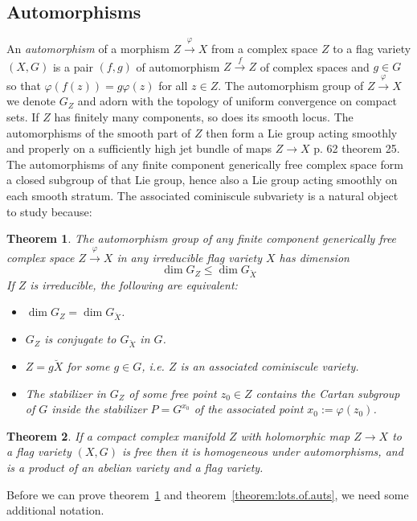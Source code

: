 \documentclass[a4paper,10pt]{amsart}
\newtheorem{theorem}{Theorem}
\theoremstyle{remark}
\begin{document}
\subsection{Automorphisms}\label{subsection:Freedom}
An \emph{automorphism} of a morphism \(Z\xrightarrow{\varphi}X\) from a complex space \(Z\) to a flag variety \((X,G)\) is a pair \((f,g)\) of automorphism \(Z\xrightarrow{f}Z\) of complex spaces and \(g\in G\) so that \(\varphi(f(z))=g\varphi(z)\) for all \(z\in Z\).
The automorphism group of \(Z\xrightarrow{\varphi}X\) we denote \(G_Z\) and adorn with the topology of uniform convergence on compact sets.
If \(Z\) has finitely many components, so does its smooth locus.
The automorphisms of the smooth part of \(Z\) then form a Lie group acting smoothly and properly on a sufficiently high jet bundle of maps \(Z\to X\) \cite{mckay2023introduction} p. 62 theorem 25.
The automorphisms of any finite component generically free complex space form a closed subgroup of that Lie group, hence also a Lie group acting smoothly on each smooth stratum.
The associated cominiscule subvariety is a natural object to study because:
\begin{theorem}\label{theorem:freedom}
The automorphism group of any finite component generically free complex space \(Z\xrightarrow{\varphi}X\) in any irreducible flag variety \(X\) has dimension 
\[
\dim G_Z\le \dim G_{\breve{X}}
\]
If \(Z\) is irreducible, the following are equivalent:
\begin{itemize}
\item
\(\dim G_Z=\dim G_{\breve{X}}\).
\item
\(G_Z\) is conjugate to \(G_{\breve{X}}\) in \(G\).
\item
\(Z=g\breve{X}\) for some \(g\in G\), i.e. \(Z\) is an associated cominiscule variety.
\item
The stabilizer in \(G_Z\) of some free point \(z_0\in Z\) contains the Cartan subgroup of \(G\) inside the stabilizer \(P=G^{x_0}\) of the associated point \(x_0:=\varphi(z_0)\).
\end{itemize}
\end{theorem}
\begin{theorem}\label{theorem:lots.of.auts}
If a compact complex manifold \(Z\) with holomorphic map \(Z\to X\) to a flag variety \((X,G)\) is free then it is homogeneous under automorphisms, and is a product of an abelian variety and a flag variety.
\end{theorem}
Before we can prove theorem~\ref{theorem:freedom} and theorem~\vref{theorem:lots.of.auts}, we need some additional notation.
\end{document}
